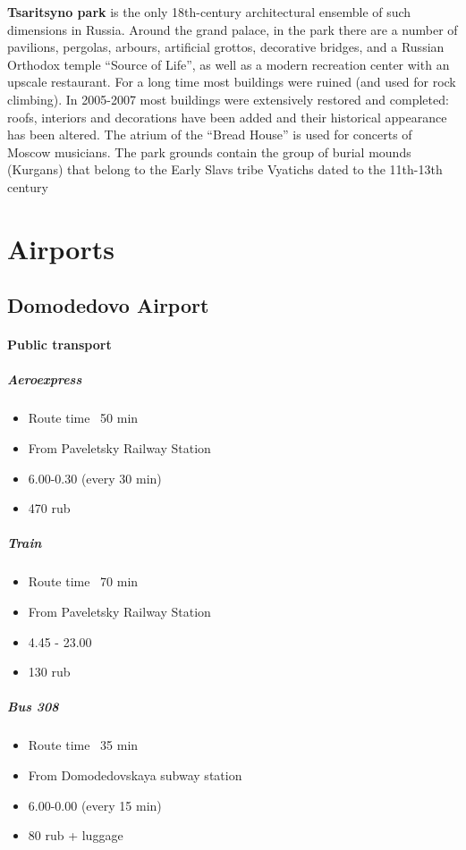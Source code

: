 \documentclass[10pt,fleqn,openany]{book} %
\begin{document}
	\textbf{Tsaritsyno park} is the only 18th-century architectural ensemble of such dimensions in Russia. Around the grand palace, in the park there are a number of pavilions, pergolas, arbours, artificial grottos, decorative bridges, and a Russian Orthodox temple “Source of Life”, as well as a modern recreation center with an upscale restaurant. For a long time most buildings were ruined (and used for rock climbing). In 2005-2007 most buildings were extensively restored and completed: roofs, interiors and decorations have been added and their historical appearance has been altered. The atrium of the “Bread House” is used for concerts of Moscow musicians. 
	The park grounds contain the group of burial mounds (Kurgans) that belong to the Early Slavs tribe Vyatichs dated to the 11th-13th century
	
\section{Airports}

\subsection{Domodedovo Airport}
\paragraph{Public transport}
\subparagraph{Aeroexpress}
\begin{itemize}
	\item Route time ~50 min
	\item From Paveletsky Railway Station
	\item 6.00-0.30 (every 30 min)
	\item 470 rub
\end{itemize}

\subparagraph{Train}
\begin{itemize}
	\item Route time ~70 min
	\item From Paveletsky Railway Station
	\item 4.45 - 23.00
	\item 130 rub
\end{itemize}

\subparagraph{Bus 308}
\begin{itemize}
	\item Route time ~35 min
	\item From Domodedovskaya subway station
	\item 6.00-0.00 (every 15 min)
	\item 80 rub + luggage
\end{itemize}
\end{document}
